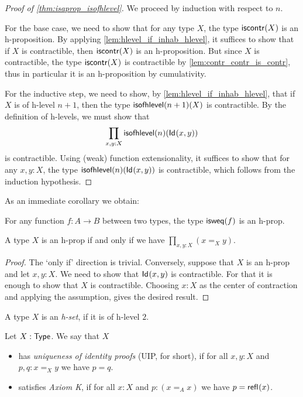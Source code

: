 \begin{proof}[Proof of \autoref{thm:isaprop_isofhlevel}]
  We proceed by induction with respect to $n$.
  
 For the base case, we need to show that for any type $X$, the type $\mathsf{iscontr}(X)$ is an
        h-proposition. By applying \autoref{lem:hlevel_if_inhab_hlevel}, it suffices to show that
        if $X$ is contractible, then $\mathsf{iscontr}(X)$ is an h-proposition.
        But since $X$ is contractible, the type $\mathsf{iscontr}(X)$ is contractible by \autoref{lem:contr_contr_is_contr},
          thus in particular it is an h-proposition by cumulativity.
 
 For the inductive step, we need to show, by \autoref{lem:hlevel_if_inhab_hlevel}, that if
        $X$ is of h-level $n+1$, then the type $\mathsf{isofhlevel}(n+1)(X)$ is contractible.
        By the definition of h-levels, we must show that
     \[  \prod_{x,y:X} \mathsf{isofhlevel}(n)(\mathsf{Id}_{}(x,y)) \]
    is contractible. Using (weak) function extensionality, it suffices to show that for any $x,y : X$,
     the type $\mathsf{isofhlevel}(n)(\mathsf{Id}_{}(x,y))$ is contractible, which follows from the induction hypothesis.
\end{proof}

As an immediate corollary we obtain:

\begin{cor}
 For any function $f \colon A \to B$ between two types, the type $\mathsf{isweq}(f)$ is an h-prop.
\end{cor}

\begin{thm}
 A type $X$ is an h-prop if and only if we have $\prod\limits_{x, y : X} (x =_X y)$.
\end{thm}

\begin{proof}
 The `only if' direction is trivial. Conversely, suppose that $X$ is an h-prop and let $x, y : X$. We need to show that $\mathsf{Id}_{}(x,y)$ is contractible. For that it is enough to show that $X$ is contractible. Choosing $x : X$ as the center of contraction and applying the assumption, gives the desired result.
\end{proof}

\begin{defn}
 A type $X$ is an {\em h-set}, if it is of h-level $2$.
\end{defn}

\begin{defn}
 Let $X : \mathsf{Type}$. We say that $X$
 \begin{itemize}
  \item has {\em uniqueness of identity proofs} (UIP, for short), if for all $x, y : X$ and $p, q : x =_X y$ we have $p = q$.
  \item satisfies {\em Axiom K}, if for all $x : X$ and $p : (x =_A x)$ we have $p = \mathsf{refl}_{}(x)$.
 \end{itemize}
\end{defn}


